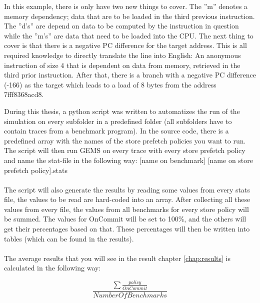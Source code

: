  In this example, there is only have two new things to cover. The ”m” denotes a
memory dependency; data that are to be loaded in the third previous instruction.
The ”d’s” are depend on data to be computed by the instruction in question while the
”m’s” are data that need to be loaded into the CPU. The next thing to cover is that
there is a negative PC difference for the target address. This is all required knowledge
to directly translate the line into English: An anonymous instruction of size 4 that is dependent on
data from memory, retrieved in the third prior instruction. After that, there
is a branch with a negative PC difference (-166) as the target which leads to a load
of 8 bytes from the address 7fff8368acd8.

During this thesis, a python script was written to automatizes the run of the simulation
on every subfolder in a predefined folder (all subfolders have to contain traces
from a benchmark program). In the source code, there is a predefined array with the
 names of the store prefetch policies you want to run. The script will then run GEMS
on every trace with every store prefetch policy and name the stat-file in the following
way: [name on benchmark] [name on store prefetch policy].stats
 \\ \\
The script will also generate the results by reading some values from every stats file,
the values to be read are hard-coded into an array. After collecting all these
values from every file, the values from all benchmarks for every store policy will be
summed. The values for OnCommit will be set to 100\%, and the others will get their
percentages based on that. These percentages will then be written into tables (which
can be found in the results).
\\\\
The average results that you will see in the result chapter \ref{chap:results} is calculated in the following way:

$$\frac{\sum \frac{policy}{OnCommit}}{NumberOfBenchmarks}$$ 

